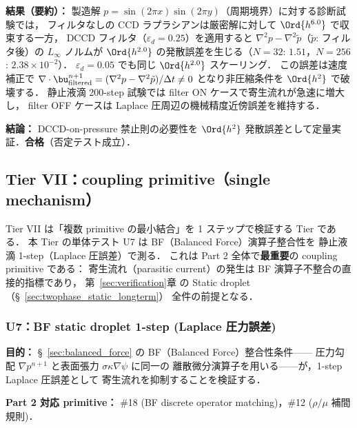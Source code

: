 \noindent\textbf{結果（要約）：}
製造解 $p = \sin(2\pi x)\sin(2\pi y)$（周期境界）に対する診断試験では，
フィルタなしの CCD ラプラシアンは厳密解に対して $\Ord{h^{6.0}}$ で収束する一方，
DCCD フィルタ（$\varepsilon_d = 0.25$）を適用すると
$\nabla^2 p - \nabla^2 \tilde{p}$（$\tilde{p}$: フィルタ後）の $L_\infty$ ノルムが
$\Ord{h^{2.0}}$ の発散誤差を生じる（$N = 32$: $1.51$，$N = 256$: $2.38 \times 10^{-2}$）．
$\varepsilon_d = 0.05$ でも同じ $\Ord{h^{2.0}}$ スケーリング．
この誤差は速度補正で
$\nabla \cdot \bu^{n+1}_\mathrm{filtered} = (\nabla^2 p - \nabla^2 \tilde{p})/\Delta t \neq 0$
となり非圧縮条件を $\Ord{h^2}$ で破壊する．
静止液滴 200-step 試験では filter ON ケースで寄生流れが急速に増大し，
filter OFF ケースは Laplace 圧周辺の機械精度近傍誤差を維持する．

\noindent\textbf{結論：}
DCCD-on-pressure 禁止則の必要性を $\Ord{h^2}$ 発散誤差として定量実証．\textbf{合格}（否定テスト成立）．

\subsection{Tier VII：coupling primitive（single mechanism）}
\label{sec:verify_coupling}

Tier VII は「複数 primitive の最小結合」を 1 ステップで検証する Tier である．
本 Tier の単体テスト U7 は BF（Balanced Force）演算子整合性を
静止液滴 1-step（Laplace 圧誤差）で測る．
これは Part 2 全体で\textbf{最重要}の coupling primitive である：
寄生流れ（parasitic current）の発生は BF 演算子不整合の直接的指標であり，
第~\ref{sec:verification}章 の Static droplet（§~\ref{sec:twophase_static_longterm}）
全件の前提となる．

\subsubsection{U7：BF static droplet 1-step (Laplace 圧力誤差)}
\label{sec:U7_bf_static_droplet}

\noindent\textbf{目的：}
§~\ref{sec:balanced_force} の BF（Balanced Force）整合性条件——
圧力勾配 $\nabla p^{n+1}$ と表面張力 $\sigma\kappa\nabla\psi$ に同一の
離散微分演算子を用いる——が，1-step Laplace 圧誤差として
寄生流れを抑制することを検証する．

\noindent\textbf{Part 2 対応 primitive：}
\#18 (BF discrete operator matching)，\#12 ($\rho/\mu$ 補間規則)．

